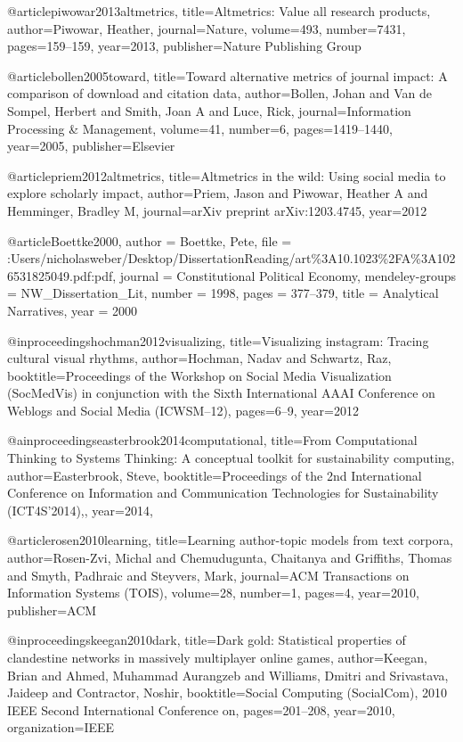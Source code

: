 @article{piwowar2013altmetrics,
  title={Altmetrics: Value all research products},
  author={Piwowar, Heather},
  journal={Nature},
  volume={493},
  number={7431},
  pages={159--159},
  year={2013},
  publisher={Nature Publishing Group}
}

@article{bollen2005toward,
  title={Toward alternative metrics of journal impact: A comparison of download and citation data},
  author={Bollen, Johan and Van de Sompel, Herbert and Smith, Joan A and Luce, Rick},
  journal={Information Processing \& Management},
  volume={41},
  number={6},
  pages={1419--1440},
  year={2005},
  publisher={Elsevier}
}

@article{priem2012altmetrics,
  title={Altmetrics in the wild: Using social media to explore scholarly impact},
  author={Priem, Jason and Piwowar, Heather A and Hemminger, Bradley M},
  journal={arXiv preprint arXiv:1203.4745},
  year={2012}
}

@article{Boettke2000,
author = {Boettke, Pete},
file = {:Users/nicholasweber/Desktop/DissertationReading/art\%3A10.1023\%2FA\%3A1026531825049.pdf:pdf},
journal = {Constitutional Political Economy},
mendeley-groups = {NW\_Dissertation\_Lit},
number = {1998},
pages = {377--379},
title = {{Analytical Narratives}},
year = {2000}
}

@inproceedings{hochman2012visualizing,
  title={Visualizing instagram: Tracing cultural visual rhythms},
  author={Hochman, Nadav and Schwartz, Raz},
  booktitle={Proceedings of the Workshop on Social Media Visualization (SocMedVis) in conjunction with the Sixth International AAAI Conference on Weblogs and Social Media (ICWSM--12)},
  pages={6--9},
  year={2012}
}

@ainproceedings{easterbrook2014computational,
  title={From Computational Thinking to Systems Thinking: A conceptual toolkit for sustainability computing},
  author={Easterbrook, Steve},
  booktitle={Proceedings of the 2nd International Conference on Information and Communication Technologies for Sustainability (ICT4S’2014),},
  year={2014},
}


@article{rosen2010learning,
  title={Learning author-topic models from text corpora},
  author={Rosen-Zvi, Michal and Chemudugunta, Chaitanya and Griffiths, Thomas and Smyth, Padhraic and Steyvers, Mark},
  journal={ACM Transactions on Information Systems (TOIS)},
  volume={28},
  number={1},
  pages={4},
  year={2010},
  publisher={ACM}
}

@inproceedings{keegan2010dark,
  title={Dark gold: Statistical properties of clandestine networks in massively multiplayer online games},
  author={Keegan, Brian and Ahmed, Muhammad Aurangzeb and Williams, Dmitri and Srivastava, Jaideep and Contractor, Noshir},
  booktitle={Social Computing (SocialCom), 2010 IEEE Second International Conference on},
  pages={201--208},
  year={2010},
  organization={IEEE}
}

